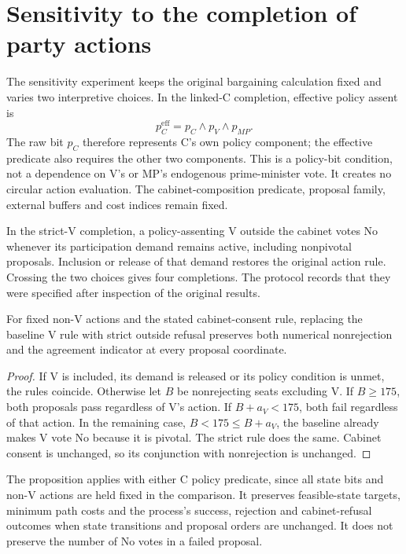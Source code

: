 \section{Sensitivity to the completion of party actions}
\label{app:completion}

The sensitivity experiment keeps the original bargaining calculation fixed and varies two interpretive choices. In the linked-C completion, effective policy assent is
\[
p_C^{\mathrm{eff}}=p_C\land p_V\land p_{MP}.
\]
The raw bit \(p_C\) therefore represents C's own policy component; the effective predicate also requires the other two components. This is a policy-bit condition, not a dependence on V's or MP's endogenous prime-minister vote. It creates no circular action evaluation. The cabinet-composition predicate, proposal family, external buffers and cost indices remain fixed.

In the strict-V completion, a policy-assenting V outside the cabinet votes No whenever its participation demand remains active, including nonpivotal proposals. Inclusion or release of that demand restores the original action rule. Crossing the two choices gives four completions. The protocol records that they were specified after inspection of the original results.

\begin{proposition}\label{prop:strict-v}
For fixed non-V actions and the stated cabinet-consent rule, replacing the baseline V rule with strict outside refusal preserves both numerical nonrejection and the agreement indicator at every proposal coordinate.
\end{proposition}
\begin{proof}
If V is included, its demand is released or its policy condition is unmet, the rules coincide. Otherwise let \(B\) be nonrejecting seats excluding V. If \(B\ge175\), both proposals pass regardless of V's action. If \(B+a_V<175\), both fail regardless of that action. In the remaining case, \(B<175\le B+a_V\), the baseline already makes V vote No because it is pivotal. The strict rule does the same. Cabinet consent is unchanged, so its conjunction with nonrejection is unchanged.
\end{proof}

The proposition applies with either C policy predicate, since all state bits and non-V actions are held fixed in the comparison. It preserves feasible-state targets, minimum path costs and the process's success, rejection and cabinet-refusal outcomes when state transitions and proposal orders are unchanged. It does not preserve the number of No votes in a failed proposal.

